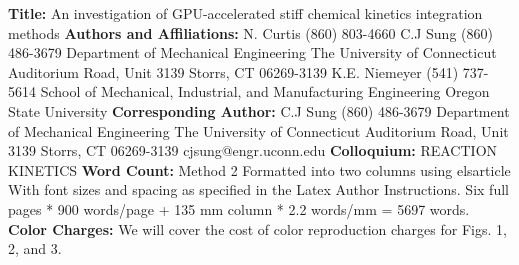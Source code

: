 \documentclass[preprint]{elsarticle}
\begin{document}
\begin{titlepage}
\parbox{\linewidth}{
\begin{flushleft}
\textbf{Title:}\linebreak
An investigation of GPU-accelerated stiff chemical kinetics integration methods
\linebreak
\linebreak
\textbf{Authors and Affiliations:} \linebreak\linebreak
  N.  Curtis	(860) 803-4660 \linebreak
  C.J Sung	(860) 486-3679 \linebreak
  Department of Mechanical Engineering \linebreak
  The University of Connecticut  Auditorium Road, Unit 3139 \linebreak
  Storrs, CT 06269-3139 \linebreak
  \linebreak
  K.E. Niemeyer	(541) 737-5614 \linebreak
  School of Mechanical, Industrial, and Manufacturing Engineering\linebreak
  Oregon State University\linebreak
\linebreak
\textbf{Corresponding Author:}\linebreak
  C.J Sung\linebreak
  (860) 486-3679 \linebreak
  Department of Mechanical Engineering\linebreak
  The University of Connecticut  Auditorium Road, Unit 3139 \linebreak
  Storrs, CT 06269-3139 \linebreak
  cjsung@engr.uconn.edu\linebreak
\linebreak
\textbf{Colloquium:}\linebreak
REACTION KINETICS\linebreak
\linebreak
\textbf{Word Count:}\linebreak
Method 2\linebreak
Formatted into two columns using elsarticle\linebreak
With font sizes and spacing as specified in the Latex Author Instructions.\linebreak
Six full pages * 900 words/page + 135 mm column * 2.2 words/mm = 5697 words.\linebreak
\textbf{Color Charges:}\linebreak
We will cover the cost of color reproduction charges for Figs. 1, 2, and 3. \linebreak
\end{flushleft}
}
\end{titlepage}
\end{document}

